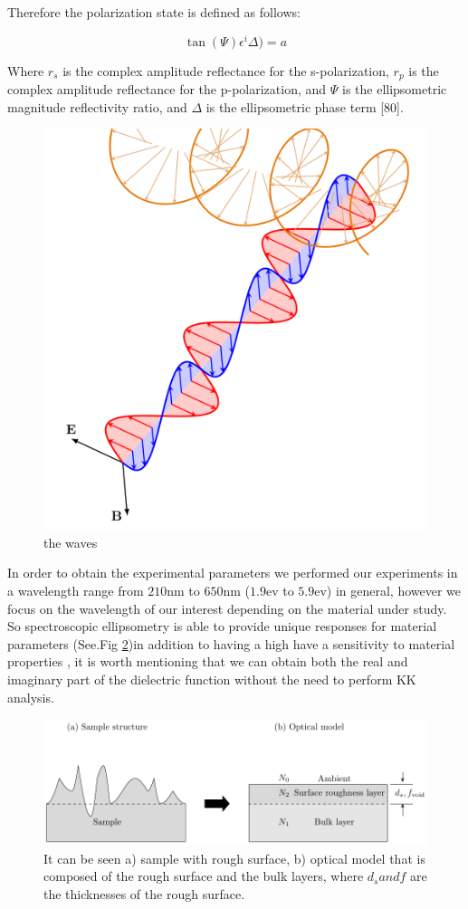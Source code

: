 Therefore the polarization state is defined as follows: 

\begin{equation}
	\tan(\Psi)\epsilon^i\Delta)=a
\end{equation}

Where $r_s$ is the complex amplitude reflectance for the s-polarization, $r_p$ is the complex amplitude reflectance for the p-polarization, and $\Psi$ is the ellipsometric magnitude reflectivity ratio, and $\Delta$ is the ellipsometric phase term [80].

\begin{figure}[H]
	\centering
	\includegraphics[width=0.5\linewidth]{FIGURES/Characterization_techniques/ellips-01.png}
	\caption{the waves}
	\label{fig:ellips}
\end{figure}

In order to obtain the experimental parameters we performed our experiments in a wavelength range from $210$nm to $650$nm  ($1.9$ev to $5.9$ev) in general, however we focus on the wavelength of our interest depending on the material under study. So spectroscopic ellipsometry is able to provide unique responses for material parameters (See.Fig \ref{fig:SE-surface})in addition to having a high have a sensitivity to material properties , it is worth mentioning that we can obtain both the real and imaginary part of the dielectric function without the need to perform KK analysis.\\


\begin{figure}[H]
	\centering
	\includegraphics[width=0.8\linewidth]{FIGURES/Characterization_techniques/Surface-01}
	\caption{It can be seen a) sample with rough surface, b) optical model that is composed of the rough surface and the bulk layers, where $d_s and f$ are the thicknesses of the rough surface.}
	\label{fig:SE-surface}
\end{figure}


